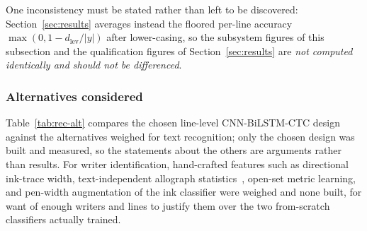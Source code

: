 One inconsistency must be stated rather than left to be discovered: Section~\ref{sec:results} averages instead the floored per-line accuracy $\max(0,1-d_{\mathrm{lev}}/|y|)$ after lower-casing, so the subsystem figures of this subsection and the qualification figures of Section~\ref{sec:results} are \emph{not computed identically and should not be differenced}.

\subsubsection{Alternatives considered}

Table~\ref{tab:rec-alt} compares the chosen line-level CNN-BiLSTM-CTC design against the alternatives weighed for text recognition; only the chosen design was built and measured, so the statements about the others are arguments rather than results. For writer identification, hand-crafted features such as directional ink-trace width, text-independent allograph statistics~\cite{bulacu2007}, open-set metric learning, and pen-width augmentation of the ink classifier were weighed and none built, for want of enough writers and lines to justify them over the two from-scratch classifiers actually trained.

